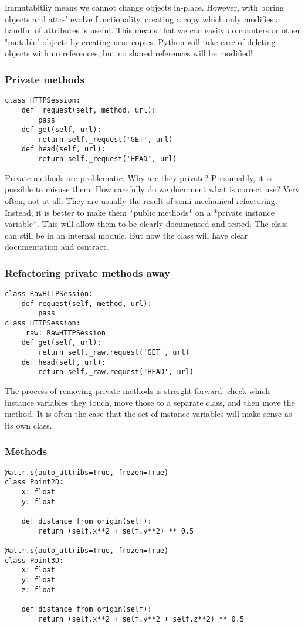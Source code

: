 Immutabitliy means we cannot change objects in-place.
However,
with boring objects
and attrs' evolve functionality,
creating a copy which only modifies a handful of attributes is useful.
This means that we can easily do counters or other
"mutable" objects
by creating near copies.
Python will take care of deleting objects with no references,
but no shared references will be modified!

\begin{frame}[fragile]
\frametitle{Private methods}

\begin{lstlisting}
class HTTPSession:
    def _request(self, method, url):
        pass
    def get(self, url):
        return self._request('GET', url)
    def head(self, url):
        return self._request('HEAD', url)
\end{lstlisting}
    
\end{frame}

Private methods are problematic.
Why are they private?
Presumably,
it is possible to misuse them.
How carefully do we document what is correct use?
Very often,
not at all.
They are usually the result of semi-mechanical refactoring.
Instead,
it is better to make them
*public methods*
on a
*private instance variable*.
This will allow them to be clearly documented and tested.
The class can still be in an internal module.
But now the class will have clear documentation
and contract.

\begin{frame}[fragile]
\frametitle{Refactoring private methods away}

\begin{lstlisting}
class RawHTTPSession:
    def request(self, method, url):
        pass
class HTTPSession:
    _raw: RawHTTPSession
    def get(self, url):
        return self._raw.request('GET', url)
    def head(self, url):
        return self._raw.request('HEAD', url)
\end{lstlisting}
    
\end{frame}

The process of removing private methods is straight-forward:
check which instance variables they touch,
move those to a separate class,
and then move the method.
It is often the case that the set of instance variables
will
make sense as its own class.

\begin{frame}[fragile]
\frametitle{Methods}

\begin{lstlisting}
@attr.s(auto_attribs=True, frozen=True)
class Point2D:
    x: float
    y: float

    def distance_from_origin(self):
        return (self.x**2 + self.y**2) ** 0.5

@attr.s(auto_attribs=True, frozen=True)
class Point3D:
    x: float
    y: float
    z: float

    def distance_from_origin(self):
        return (self.x**2 + self.y**2 + self.z**2) ** 0.5
\end{lstlisting}

\end{frame}

